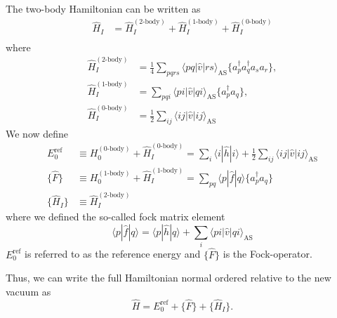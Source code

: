 \documentclass[a4paper,10pt]{report}
\newcommand{\braket}[1]{\langle#1\rangle}
\theoremstyle{definition}
\begin{document}
The two-body Hamiltonian can be written as 
\begin{align}
 \hat{H}_I &= \hat{H}_I^{(2\text{-body})} + \hat{H}_I^{(1\text{-body})} + \hat{H}_I^{(0\text{-body})} \\
\end{align}
where 
\begin{align}
 \hat{H}_I^{(2\text{-body})} &= \frac{1}{4}\sum_{pqrs} \braket{pq|\hat{v}|rs}_{\text{AS}}\{a_p^\dagger a_q^\dagger a_s a_r \}, \\
 \hat{H}_I^{(1\text{-body})} &= \sum_{pqi} \braket{pi|\hat{v}|qi}_{\text{AS}} \{a_p^\dagger a_q \}, \\
 \hat{H}_I^{(0\text{-body})} &= \frac{1}{2} \sum_{ij} \braket{ij|\hat{v}|ij}_{\text{AS}}
\end{align}
We now define 
\begin{align*}
 E_0^{\text{ref}} &\equiv H_0^{(0\text{-body})} + \hat{H}_I^{(0\text{-body})} = \sum_i \braket{i|\hat{h}|i} + \frac{1}{2} \sum_{ij} \braket{ij|\hat{v}|ij}_{\text{AS}} \\
 \{ \hat{F} \} &\equiv H_0^{(1\text{-body})} + \hat{H}_I^{(1\text{-body})} = \sum_{pq} \braket{p|\hat{f}|q} \{a_p^\dagger a_q\} \\
 \{ \hat{H}_I \} &\equiv \hat{H}_I^{(2\text{-body})}
\end{align*}
where we defined the so-called fock matrix element 
\begin{equation}
 \braket{p|\hat{f}|q} = \braket{p|\hat{h}|q} + \sum_i \braket{pi|\hat{v}|qi}_{\text{AS}}
\end{equation}
$E_0^\text{ref}$ is referred to as the reference energy and $\{ \hat{F} \}$ is the Fock-operator.

Thus, we can write the full Hamiltonian normal ordered relative to the new vacuum as 
\begin{equation}
 \hat{H} =  E_0^{\text{ref}} + \{ \hat{F} \} + \{ \hat{H}_I \}.
\end{equation}
\end{document}
